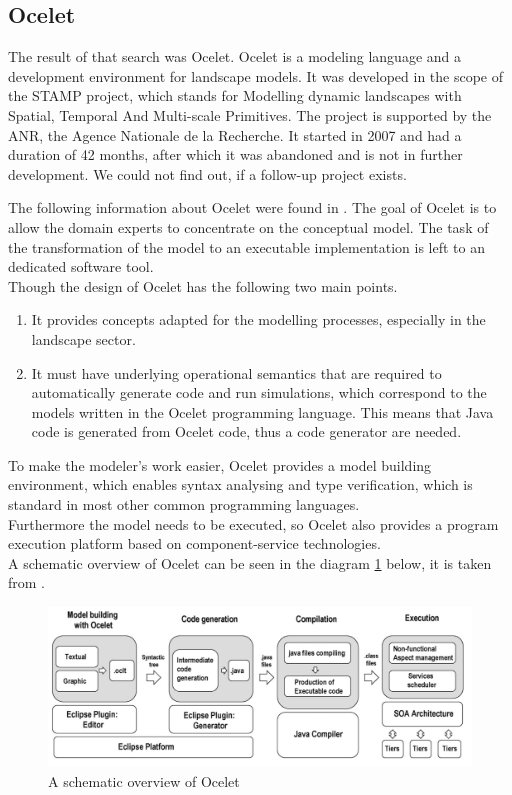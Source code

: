 \subsection{Ocelet}
\par
The result of that search was Ocelet. Ocelet is a modeling language and a development environment for landscape models. It was developed in the scope of the STAMP project, which stands for Modelling dynamic landscapes with Spatial, Temporal And Multi-scale Primitives. \autocite{dsl:ocelet-wiki} The project is supported by the ANR, the Agence Nationale de la Recherche. It started in 2007 and had a duration of 42 months, after which it was abandoned and is not in further development. We could not find out, if a follow-up project exists.
\par
The following information about Ocelet were found in \autocite{dsl:ocelet-design}. The goal of Ocelet is to allow the domain experts to concentrate on the conceptual model. The task of the transformation of the model to an executable implementation is left to an dedicated software tool.  \\
Though the design of Ocelet has the following two main points.
\begin{enumerate}
	\item It provides concepts adapted for the modelling processes, especially in the landscape sector.
	\item It must have underlying operational semantics that are required to automatically generate code and run simulations, which correspond to the models written in the Ocelet programming language. This means that Java code is generated from Ocelet code, thus a code generator are needed.
\end{enumerate}
To make the modeler’s work easier, Ocelet provides a model building environment, which enables syntax analysing and type verification, which is standard in most other common programming languages. \\
Furthermore the model needs to be executed, so Ocelet also provides a program execution platform based on component-service technologies. \\
A schematic overview of Ocelet can be seen in the diagram \ref{fig:ocelet_modelling_and_simulation_framework} below, it is taken from \autocite{dsl:ocelet-design}.
\begin{figure}[h]
	\centering
	\includegraphics[width=1.0\textwidth]{pics/ocelet/ocelet_modelling_and_simulation_framework.png}
	\caption{A schematic overview of Ocelet \label{fig:ocelet_modelling_and_simulation_framework}}	
\end{figure}

